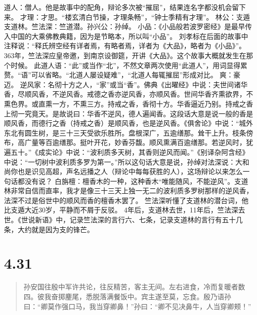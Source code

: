 \documentclass[]{book}
\begin{document}
道人：僧人。他是故事中的配角，辩论多次被``摧屈''，结果连名字都没机会留下来。
才理：才思。``楼玄清白节操，才理条畅''，``钟士季精有才理''。
林公：支遁支道林。竺法深：竺道潜。孙兴公：孙绰。
小品：《小品般若波罗密经》是最早传入中国的大乘佛教典籍，因为是节略本，所以叫``小品''。
刘孝标在后面的故事中注释说：``释氏辨空经有详者焉，有略者焉，详者为《大品》，略者为《小品》''。363年，竺法深应皇帝邀，到南京设御筵，开讲《大品》。这个故事大概就发生在那个时候。
此道人语：``此''或当作``北''，不然文章两次使用``此道人''，用词显得累赘。``语''可以省略。``北道人屡设疑难''，``北道人每辄摧屈''形成对比。
爽：豪迈。
逆风家：名彻十方之人，``家''或当``香''。佛典《出曜经》中说：夫世间诸华香，尽顺风香，不逆风香。戒德之香亦逆风香，亦顺风香。世间华香齐熏欲界，不熏色界。或直熏一方，不熏三方。持戒之香，香彻十方。华香逼近乃别。持戒之香上彻一究竟天。是故说曰：华香不逆风，德人遍闻香。这段话大意是说一般的香是顺风香，而德行之香（持戒之香）是顺风香，也是逆风香。《俱舍论》中说：``城外东北有圆生树，是三十三天受欲乐胜所。盘根深广，五逾缮那。耸干上升。枝条傍布，高广量等百逾缮那。挺叶开花，妙香芬馥。顺风熏满百逾缮那。若逆风时，犹遍五十。''《成实论》中说：``波利质多天树，其香则逆风而闻。''《别译杂阿含经》中说：``一切树中波利质多罗为第一。''所以这句话大意是说，孙绰对法深说：大和尚你也是识见高超，声名远播之人（辩论中每每获胜的人），这场辩论以来怎么一句话都没有说？
白旃檀：檀香木的一种，这种香木``唯能随风，不能逆风''。支道林非常自信而直率，我才是像三十三天上独一无二的波利质多罗树那样的逆风香，法深不过是俗世中的顺风而香的檀香木罢了。
竺法深听懂了支道林的潜台词，他比支遁大近30岁，平静而不屑于反驳。
4年后，支道林去世，11年后，竺法深去世。《世说新语》中，记录竺法深的言行六、七条，记录支道林的言行有五十几条，大约就是因为支的锋芒。

\section{4.31}\label{section-209}

\begin{quote}
孙安国往殷中军许共论，往反精苦，客主无间。左右进食，冷而复暖者数四。彼我奋掷麈尾，悉脱落满餐饭中。宾主遂至莫，忘食。殷乃语孙曰：``卿莫作强口马，我当穿卿鼻！''孙曰：``卿不见决鼻牛，人当穿卿颊！''
\end{quote}
\end{document}
